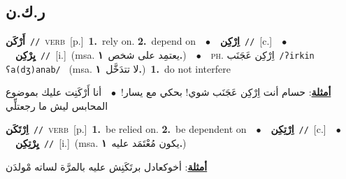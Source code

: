 \documentclass[10pt,a4paper,twoside]{article} %
\begin{document}
\begin{multicols}{2}
\vspace{-3mm}
\subsection*{\color{blue}\foreignlanguage{arabic}{ر.ك.ن}\color{blue}{}} 

{\setlength\topsep{0pt}\textbf{\foreignlanguage{arabic}{أَرْكَن}}\ {\color{gray}\texttt{//}\color{black}}\ \textsc{verb}\ [p.]\ \textbf{1.}~rely on.  \textbf{2.}~depend on\ \ $\bullet$\ \ \setlength\topsep{0pt}\textbf{\foreignlanguage{arabic}{اِرْكِن}}\ {\color{gray}\texttt{//}\color{black}}\ [c.]\ \ $\bullet$\ \ \setlength\topsep{0pt}\textbf{\foreignlanguage{arabic}{يِرْكِن}}\ {\color{gray}\texttt{//}\color{black}}\ [i.]\ \color{gray}(msa. \foreignlanguage{arabic}{يعتمِد على شخص}~\foreignlanguage{arabic}{\textbf{١.}})\color{black}\ \ $\bullet$\ \ \textsc{ph.} \color{gray} \foreignlanguage{arabic}{اِرْكِن عَجَنَب}\color{black}\ {\color{gray}\texttt{/{\sffamily ʔirkin ʕa(dʒ)anab}/}\color{black}}\ \color{gray} (msa. \foreignlanguage{arabic}{لا تتدَخَّل}~\foreignlanguage{arabic}{\textbf{١.}})\color{black}\ \textbf{1.}~do not interfere\  \begin{flushright}\color{gray}\foreignlanguage{arabic}{\textbf{\underline{\foreignlanguage{arabic}{أمثلة}}}: حسام أنت اِرْكِن عَجَنَب شوي! بحكي مع يسار!\ $\bullet$\ \  أنا أَرْكَنِت عليك بموضوع المحابس ليش ما رجعتلِّي}\end{flushright}\color{black}} \vspace{2mm}

{\setlength\topsep{0pt}\textbf{\foreignlanguage{arabic}{اِرْتَكَن}}\ {\color{gray}\texttt{//}\color{black}}\ \textsc{verb}\ [p.]\ \textbf{1.}~be relied on.  \textbf{2.}~be dependent on\ \ $\bullet$\ \ \setlength\topsep{0pt}\textbf{\foreignlanguage{arabic}{اِرْتِكِن}}\ {\color{gray}\texttt{//}\color{black}}\ [c.]\ \ $\bullet$\ \ \setlength\topsep{0pt}\textbf{\foreignlanguage{arabic}{يِرْتِكِن}}\ {\color{gray}\texttt{//}\color{black}}\ [i.]\ \color{gray}(msa. \foreignlanguage{arabic}{يكون مُعْتَمَد عليه}~\foreignlanguage{arabic}{\textbf{١.}})\color{black}\  \begin{flushright}\color{gray}\foreignlanguage{arabic}{\textbf{\underline{\foreignlanguage{arabic}{أمثلة}}}: أخوكعادل برتَكَنِش عليه بالمرَّة لساته مْولدَن}\end{flushright}\color{black}} \vspace{2mm}


\end{multicols}
\end{document}
